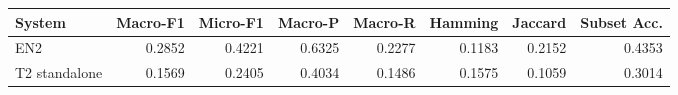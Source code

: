 \begin{tabular}{lrrrrrrr}
\toprule
System & Macro-F1 & Micro-F1 & Macro-P & Macro-R & Hamming & Jaccard & Subset Acc. \\
\midrule
EN2 & 0.2852 & 0.4221 & 0.6325 & 0.2277 & 0.1183 & 0.2152 & 0.4353 \\
T2 standalone & 0.1569 & 0.2405 & 0.4034 & 0.1486 & 0.1575 & 0.1059 & 0.3014 \\
\bottomrule
\end{tabular}
